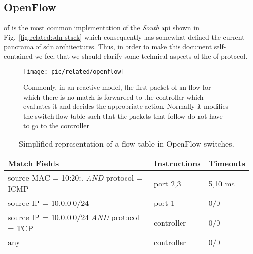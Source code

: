 \subsection{OpenFlow}
\label{sec:related:openflow-spec}
\gls{of} is the most common implementation of the \emph{South} \gls{api} shown in Fig.~\ref{fig:related:sdn-stack} which consequently has  
somewhat defined the current panorama of \gls{sdn} architectures. 
Thus, in order to make this document self-contained we feel that we should clarify some technical aspects of the \gls{of}  protocol. 

\begin{figure}
  \centering
  \texttt{[image: pic/related/openflow]}
  \caption[Flow Request ]{Commonly, in an reactive model, the first packet of an flow for which there is no match is forwarded to the controller which evaluates it and decides the appropriate action. Normally it modifies the switch flow table such that the packets that follow do not have to go to the controller. }
  \label{fig:related:reactive}
\end{figure}

\begin{table}[ht]
  \centering
  \begin{tabular}[ht]{lll}
    Match Fields &  Instructions & Timeouts \\ \toprule 
    source MAC = 10:20:. \emph{AND}  protocol = ICMP  & port 2,3 & 5,10 ms \\ 
    source IP = 10.0.0.0/24  & port 1 &  0/0 \\
    source IP = 10.0.0.0/24 \emph{AND} protocol = TCP & controller & 0/0 \\ 
    any & controller & 0/0 \\ \bottomrule 
  \end{tabular}
  \caption[Openflow Flow Table]{Simplified representation of a flow table in OpenFlow switches.}
  \label{tab:related:openflow-flows}
\end{table}

